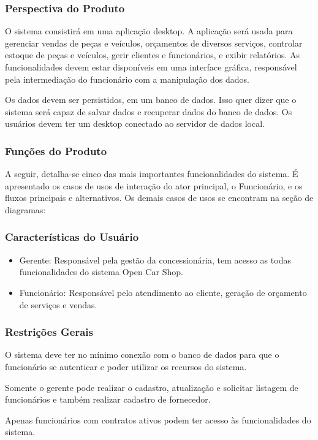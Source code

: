 	\subsubsection{Perspectiva do Produto}
	\par
	O sistema consistirá em uma aplicação  desktop. A aplicação  será usada para gerenciar vendas de peças e veículos, orçamentos de diversos serviços,  controlar estoque de peças e veículos, gerir clientes e funcionários, e exibir  relatórios. As funcionalidades devem estar disponíveis em uma interface gráfica, responsável pela intermediação do funcionário com a manipulação dos dados. 
	\par
	Os dados devem ser persistidos, em um banco de dados. Isso quer dizer que o sistema será capaz de salvar dados e recuperar dados do banco de dados. Os usuários devem ter um desktop conectado  ao servidor de dados local. 
	
	
	\subsubsection{Funções do Produto}
	A seguir, detalha-se cinco das mais importantes funcionalidades do sistema. É apresentado os casos de usos de interação do ator principal, o Funcionário, e os fluxos principais e alternativos. Os demais casos de usos se encontram na seção de diagramas:
	
	\subsubsection{Características do Usuário}
	
	\begin{itemize}
	\item[] Gerente: Responsável pela gestão da concessionária, tem acesso as todas   funcionalidades  do sistema Open Car Shop.
	\item[] Funcionário: Responsável pelo atendimento ao cliente, geração de orçamento de serviços e vendas.
	\end{itemize}

	\subsubsection{Restrições Gerais}
	\par
	O sistema deve ter no mínimo conexão com o banco de dados para que o funcionário se autenticar e poder utilizar os recursos do sistema. 
	\par
	Somente o gerente pode realizar o cadastro, atualização  e solicitar listagem de funcionários e também realizar cadastro de fornecedor.
	\par
	Apenas funcionários com contratos ativos podem ter acesso às funcionalidades do sistema.

